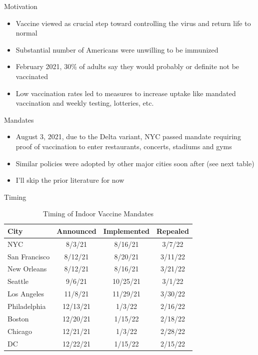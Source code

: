 \documentclass{beamer}
\begin{document}
\begin{frame}{Motivation}

\begin{itemize}
\item Vaccine viewed as crucial step toward controlling the virus and return life to normal
\item Substantial number of Americans were unwilling to be immunized
\item February 2021, 30\% of adults say they would probably or definite not be vaccinated
\item Low vaccination rates led to measures to increase uptake like mandated vaccination and weekly testing, lotteries, etc.

\end{itemize}

\end{frame}

\begin{frame}{Mandates}

\begin{itemize}
\item August 3, 2021, due to the Delta variant, NYC passed mandate requiring proof of vaccination to enter restaurants, concerts, stadiums and gyms
\item Similar policies were adopted by other major cities soon after (see next table)
\item I'll skip the prior literature for now
\end{itemize}

\end{frame}


\begin{frame}{Timing}


\begin{table}[ht]
\centering
\caption{Timing of Indoor Vaccine Mandates}
\begin{tabular}{lccc}
\toprule\toprule
City          &  Announced &  Implemented &  Repealed \\ \midrule
NYC           & 8/3/21     & 8/16/21       & 3/7/22    \\
San Francisco & 8/12/21     & 8/20/21       & 3/11/22    \\
New Orleans   & 8/12/21     & 8/16/21       & 3/21/22    \\
Seattle       & 9/6/21     & 10/25/21       & 3/1/22    \\
Los Angeles   & 11/8/21     & 11/29/21       & 3/30/22    \\
Philadelphia  & 12/13/21     & 1/3/22       & 2/16/22    \\
Boston        & 12/20/21     & 1/15/22       & 2/18/22    \\
Chicago       & 12/21/21     & 1/3/22       & 2/28/22    \\
DC            & 12/22/21     & 1/15/22       & 2/15/22    \\ \bottomrule\bottomrule
\end{tabular}
\end{table}


\end{frame}
\end{document}
